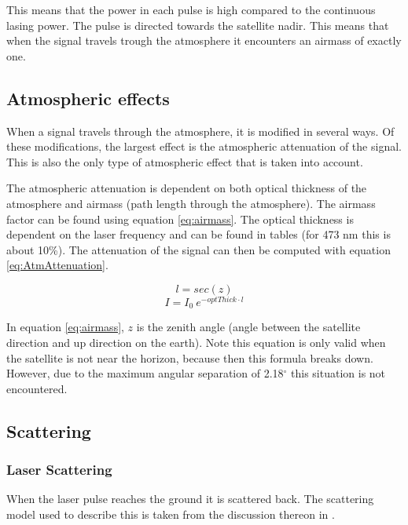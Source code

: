 This means that the power in each pulse is high compared to the continuous lasing power. The pulse is directed towards the satellite nadir. This means that when the signal travels trough the atmosphere it encounters an airmass of exactly one.

\subsection{Atmospheric effects}

When a signal travels through the atmosphere, it is modified in several ways. Of these modifications, the largest effect is the atmospheric attenuation of the signal. This is also the only type of atmospheric effect that is taken into account.

The atmospheric attenuation is dependent on both optical thickness of the atmosphere and airmass (path length through the atmosphere). The airmass factor can be found using equation \ref{eq:airmass}. The optical thickness is dependent on the laser frequency and can be found in tables (for 473 nm this is about 10\%). The attenuation of the signal can then be computed with equation \ref{eq:AtmAttenuation}.

\begin{equation}
	l = sec (z)
	\label{eq:airmass}
\end{equation}
\begin{equation}
	I = I_0 \: e^{ -optThick \cdot l }
	\label{eq:AtmAttenuation}
\end{equation}

In equation \ref{eq:airmass}, $z$ is the zenith angle (angle between the satellite direction and up direction on the earth). Note this equation is only valid when the satellite is not near the horizon, because then this formula breaks down. However, due to the maximum angular separation of 2.18$^\circ$ this situation is not encountered.

\subsection{Scattering}
\subsubsection{Laser Scattering}
\label{scatter}
When the laser pulse reaches the ground it is scattered back. The scattering model used to describe this is taken from the discussion thereon in \cite{rees}. 

